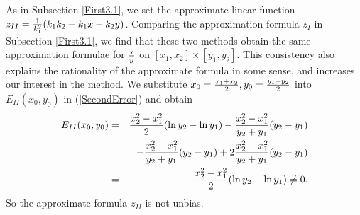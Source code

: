 \documentclass[conference]{IEEEtran}
\begin{document}
As in Subsection \ref{First3.1}, we set the approximate linear function $z_{II}={1\over k_{1}^{2}}(k_{1}k_{2}+k_{1}x-k_{2}y)$. Comparing the approximation formula $z_{I}$ in Subsection \ref{First3.1}, we find that these two methods obtain the same approximation formulae for ${x\over y}$ on $[x_{1}, x_{2}]\times [y_{1}, y_{2}]$. This consistency also explains the rationality of the approximate formula in some sense, and increases our interest in the method. We substitute $x_{0}={x_{1}+x_{2}\over 2}, y_{0}={y_{1}+y_{2}\over 2}$ into $E_{II}(x_{0}, y_{0})$ in (\ref{SecondError}) and obtain
\begin{eqnarray}
E_{II}(x_{0}, y_{0})&=&{x_{2}^{2}-x_{1}^{2}\over 2}(\ln y_{2}-\ln y_{1})-{x_{2}^{2}-x_{1}^{2}\over y_{2}+y_{1}}(y_{2}-y_{1})\nonumber\\
&&-{x_{2}^{2}-x_{1}^{2}\over y_{2}+y_{1}}(y_{2}-y_{1})+2{x_{2}^{2}-x_{1}^{2}\over y_{2}+y_{1}}(y_{2}-y_{1})\nonumber\\
&=&{x_{2}^{2}-x_{1}^{2}\over 2}(\ln y_{2}-\ln y_{1})\neq 0.\label{SecondErrResult}
\end{eqnarray}
So the approximate formula $z_{II}$ is not unbias.
\end{document}
